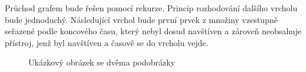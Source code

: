 Průchod grafem bude řešen pomocí rekurze. Princip rozhodování dalšího vrcholu bude jednoduchý. Následující vrchol bude první prvek z množiny vzestupně seřazené podle koncového času, který nebyl dosud navštíven a zároveň neobsahuje přístroj, jenž byl navštíven a časově se do vrcholu vejde.


\begin{figure}
	\centering
	\hspace{3em} %
	\caption{Ukázkový obrázek se dvěma podobrázky}
	\label{fig:TopLevelFigureLabel}
\end{figure}

